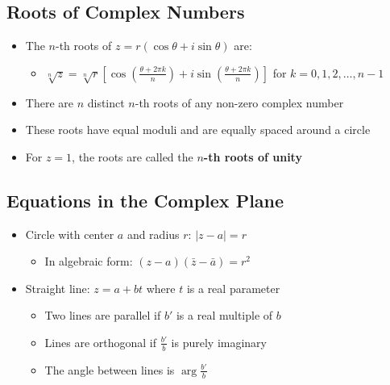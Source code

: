 \documentclass[
]{book}
\providecommand{\tightlist}{%
  \setlength{\itemsep}{0pt}\setlength{\parskip}{0pt}}
\theoremstyle{definition}
\theoremstyle{definition}
\theoremstyle{definition}
\theoremstyle{definition}
\theoremstyle{remark}
\begin{document}
\subsection{Roots of Complex Numbers}\label{roots-of-complex-numbers}

\begin{itemize}
\tightlist
\item
  The \(n\)-th roots of \(z = r(\cos\theta + i\sin\theta)\) are:

  \begin{itemize}
  \tightlist
  \item
    \(\sqrt[n]{z} = \sqrt[n]{r}\left[\cos\left(\frac{\theta + 2\pi k}{n}\right) + i\sin\left(\frac{\theta + 2\pi k}{n}\right)\right]\) for \(k = 0, 1, 2, \ldots, n-1\)
  \end{itemize}
\item
  There are \(n\) distinct \(n\)-th roots of any non-zero complex number
\item
  These roots have equal moduli and are equally spaced around a circle
\item
  For \(z = 1\), the roots are called the \textbf{\(n\)-th roots of unity}
\end{itemize}

\subsection{Equations in the Complex Plane}\label{equations-in-the-complex-plane}

\begin{itemize}
\tightlist
\item
  Circle with center \(a\) and radius \(r\): \(|z - a| = r\)

  \begin{itemize}
  \tightlist
  \item
    In algebraic form: \((z - a)(\bar{z} - \bar{a}) = r^2\)
  \end{itemize}
\item
  Straight line: \(z = a + bt\) where \(t\) is a real parameter

  \begin{itemize}
  \tightlist
  \item
    Two lines are parallel if \(b'\) is a real multiple of \(b\)
  \item
    Lines are orthogonal if \(\frac{b'}{b}\) is purely imaginary
  \item
    The angle between lines is \(\arg\frac{b'}{b}\)
  \end{itemize}
\end{itemize}
\end{document}
